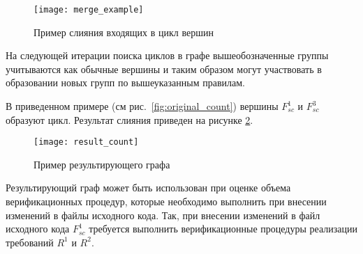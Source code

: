 \begin{figure}[H]
    \centering
    \texttt{[image: merge\_example]}
    \caption{Пример слияния входящих в цикл вершин}
    \label{fig:merge_example}
\end{figure}

На следующей итерации поиска циклов в графе вышеобозначенные группы учитываются как обычные вершины и таким образом могут участвовать в образовании новых групп по вышеуказанным правилам.

В приведенном примере (см рис.~\ref{fig:original_count}) вершины $F_{sc}^1$ и $F_{sc}^3$ образуют цикл. Результат слияния приведен на рисунке \ref{fig:result_count}.

\begin{figure}[H]
    \centering
    \texttt{[image: result\_count]}
    \caption{Пример результирующего графа}
    \label{fig:result_count}
\end{figure}

Результирующий граф может быть использован при оценке объема верификационных процедур, которые необходимо выполнить при внесении изменений в файлы исходного кода. Так, при внесении изменений в файл исходного кода $F_{sc}^1$ требуется выполнить верификационные процедуры реализации требований $R^1$ и $R^2$.